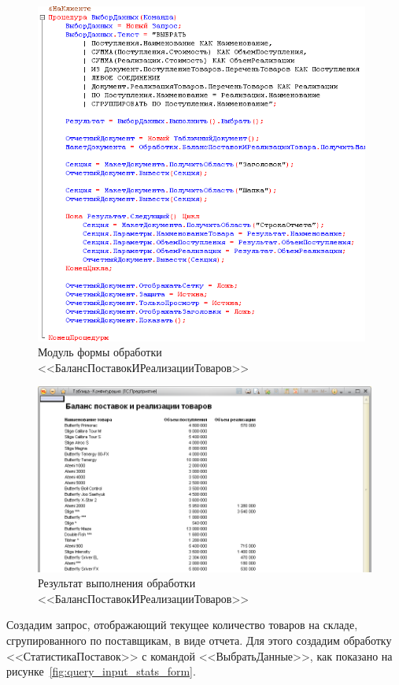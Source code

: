 \begin{figure}[h!]
  \centering
  \includegraphics[width=110mm]{pic/query_balance_module}
  \caption{Модуль формы обработки \\ <<БалансПоставокИРеализацииТоваров>>}
  \label{fig:query_balance_module}
\end{figure}

\begin{figure}[h!]
  \centering
  \includegraphics[width=150mm]{pic/query_balance_result}
  \caption{Результат выполнения обработки \\
    <<БалансПоставокИРеализацииТоваров>>}
  \label{fig:query_balance_result}
\end{figure}

\pagebreak

Создадим запрос, отображающий текущее количество товаров на складе,
сгрупированного по поставщикам, в виде отчета.
Для этого создадим обработку <<СтатистикаПоставок>>
с командой <<ВыбратьДанные>>,
как показано на рисунке~\ref{fig:query_input_stats_form}.

